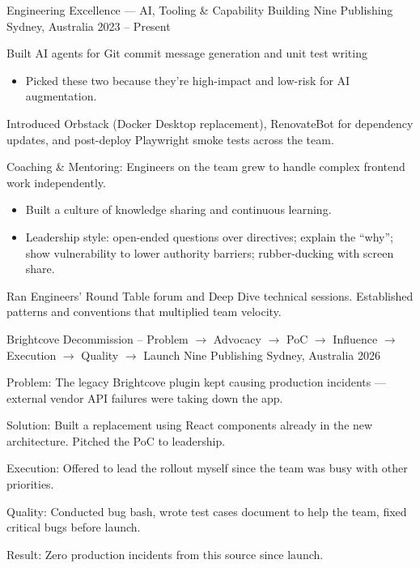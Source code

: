 \begin{cventries}
  \cventry
    {Engineering Excellence --- AI, Tooling \& Capability Building} %
    {Nine Publishing} %
    {Sydney, Australia} %
    {2023 -- Present} %
    {
      \begin{cvitems}
        \item {Built AI agents for Git commit message generation and unit test writing}
            \begin{itemize}
                \item {Picked these two because they're high-impact and low-risk for AI augmentation.}
            \end{itemize}
        \item {Introduced Orbstack (Docker Desktop replacement), RenovateBot for dependency updates, and post-deploy Playwright smoke tests across the team.}
        \item {Coaching \& Mentoring: Engineers on the team grew to handle complex frontend work independently.}
            \begin{itemize}
                \item {Built a culture of knowledge sharing and continuous learning.}
                \item {Leadership style: open-ended questions over directives; explain the ``why''; show vulnerability to lower authority barriers; rubber-ducking with screen share.}
            \end{itemize}
        \item {Ran Engineers' Round Table forum and Deep Dive technical sessions. Established patterns and conventions that multiplied team velocity.}
      \end{cvitems}
    }

\end{cventries}

  \cventry
    {Brightcove Decommission -- Problem $\rightarrow$ Advocacy $\rightarrow$ PoC $\rightarrow$ Influence $\rightarrow$ Execution $\rightarrow$ Quality $\rightarrow$ Launch} %
    {Nine Publishing} %
    {Sydney, Australia} %
    {2026} %
    {
      \begin{cvitems}
        \item {Problem: The legacy Brightcove plugin kept causing production incidents --- external vendor API failures were taking down the app.}
        \item {Solution: Built a replacement using React components already in the new architecture. Pitched the PoC to leadership.}
        \item {Execution: Offered to lead the rollout myself since the team was busy with other priorities.}
        \item {Quality: Conducted bug bash, wrote test cases document to help the team, fixed critical bugs before launch.}
        \item {Result: Zero production incidents from this source since launch.}
      \end{cvitems}
    }

\smallskip
